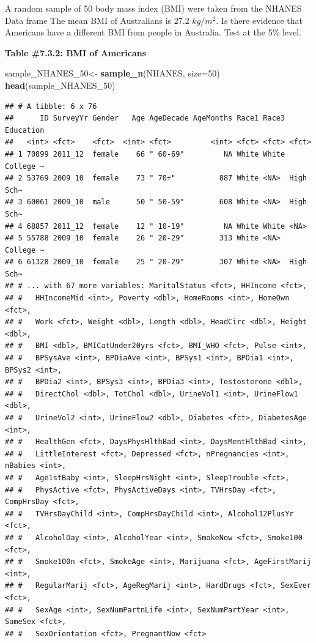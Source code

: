 \documentclass[
]{book}
\newenvironment{Shaded}{\begin{snugshade}}{\end{snugshade}}
\newcommand{\DataTypeTok}[1]{\textcolor[rgb]{0.13,0.29,0.53}{#1}}
\newcommand{\DecValTok}[1]{\textcolor[rgb]{0.00,0.00,0.81}{#1}}
\newcommand{\KeywordTok}[1]{\textcolor[rgb]{0.13,0.29,0.53}{\textbf{#1}}}
\newcommand{\NormalTok}[1]{#1}
\newcommand{\StringTok}[1]{\textcolor[rgb]{0.31,0.60,0.02}{#1}}
\begin{document}
A random sample of 50 body mass index (BMI) were taken from the NHANES Data frame The mean BMI of Australians is 27.2 \(kg/m^2\). Is there evidence that Americans have a different BMI from people in Australia. Test at the 5\% level.

\textbf{Table \#7.3.2: BMI of Americans}

\begin{Shaded}
\begin{Highlighting}[]
\NormalTok{sample_NHANES_}\DecValTok{50}\NormalTok{<-}
\StringTok{  }\KeywordTok{sample_n}\NormalTok{(NHANES, }\DataTypeTok{size=}\DecValTok{50}\NormalTok{)}
\KeywordTok{head}\NormalTok{(sample_NHANES_}\DecValTok{50}\NormalTok{)}
\end{Highlighting}
\end{Shaded}

\begin{verbatim}
## # A tibble: 6 x 76
##      ID SurveyYr Gender   Age AgeDecade AgeMonths Race1 Race3 Education
##   <int> <fct>    <fct>  <int> <fct>         <int> <fct> <fct> <fct>    
## 1 70899 2011_12  female    66 " 60-69"         NA White White College ~
## 2 53769 2009_10  female    73 " 70+"          887 White <NA>  High Sch~
## 3 60061 2009_10  male      50 " 50-59"        608 White <NA>  High Sch~
## 4 68857 2011_12  female    12 " 10-19"         NA White White <NA>     
## 5 55788 2009_10  female    26 " 20-29"        313 White <NA>  College ~
## 6 61328 2009_10  female    25 " 20-29"        307 White <NA>  High Sch~
## # ... with 67 more variables: MaritalStatus <fct>, HHIncome <fct>,
## #   HHIncomeMid <int>, Poverty <dbl>, HomeRooms <int>, HomeOwn <fct>,
## #   Work <fct>, Weight <dbl>, Length <dbl>, HeadCirc <dbl>, Height <dbl>,
## #   BMI <dbl>, BMICatUnder20yrs <fct>, BMI_WHO <fct>, Pulse <int>,
## #   BPSysAve <int>, BPDiaAve <int>, BPSys1 <int>, BPDia1 <int>, BPSys2 <int>,
## #   BPDia2 <int>, BPSys3 <int>, BPDia3 <int>, Testosterone <dbl>,
## #   DirectChol <dbl>, TotChol <dbl>, UrineVol1 <int>, UrineFlow1 <dbl>,
## #   UrineVol2 <int>, UrineFlow2 <dbl>, Diabetes <fct>, DiabetesAge <int>,
## #   HealthGen <fct>, DaysPhysHlthBad <int>, DaysMentHlthBad <int>,
## #   LittleInterest <fct>, Depressed <fct>, nPregnancies <int>, nBabies <int>,
## #   Age1stBaby <int>, SleepHrsNight <int>, SleepTrouble <fct>,
## #   PhysActive <fct>, PhysActiveDays <int>, TVHrsDay <fct>, CompHrsDay <fct>,
## #   TVHrsDayChild <int>, CompHrsDayChild <int>, Alcohol12PlusYr <fct>,
## #   AlcoholDay <int>, AlcoholYear <int>, SmokeNow <fct>, Smoke100 <fct>,
## #   Smoke100n <fct>, SmokeAge <int>, Marijuana <fct>, AgeFirstMarij <int>,
## #   RegularMarij <fct>, AgeRegMarij <int>, HardDrugs <fct>, SexEver <fct>,
## #   SexAge <int>, SexNumPartnLife <int>, SexNumPartYear <int>, SameSex <fct>,
## #   SexOrientation <fct>, PregnantNow <fct>
\end{verbatim}
\end{document}
